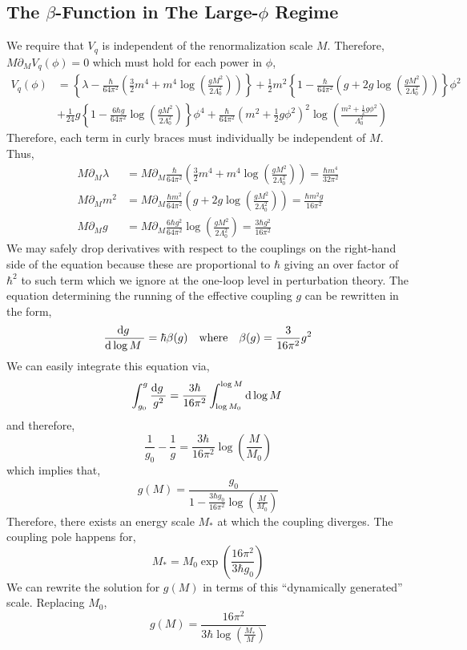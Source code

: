 \documentclass[12pt]{article}
\begin{document}
\subsection{The $\beta$-Function in The Large-$\phi$ Regime}


We require that $V_q$ is independent of the renormalization scale $M$. Therefore, $M \partial_M V_q(\phi) = 0$ which must hold for each power in $\phi$,
\begin{align*}
V_q(\phi) & = \left\{ \lambda - \frac{\hbar}{64 \pi^2} \left( \frac{3}{2} m^4 + m^4 \log{\left( \frac{g M^2}{2 \Lambda_0^2} \right)} \right) \right\} + \frac{1}{2} m^2 \left\{ 1 - \frac{\hbar}{64\pi^2} \left( g + 2 g \log{\left( \frac{g M^2}{2 \Lambda_0^2} \right)} \right) \right\} \phi^2 
\\
& + \frac{1}{24} g \left\{1 -  \frac{6 \hbar g}{64 \pi^2} \log{\left( \frac{g M^2}{2 \Lambda_0^2} \right)} \right\} \phi^4 
+ \frac{\hbar}{64 \pi^2} \left(m^2 + \tfrac{1}{2}  g \phi^2 \right)^2  \log{\left( \frac{m^2 + \tfrac{1}{2} g \phi^2 }{\Lambda_0^2}  \right)} 
\end{align*}
Therefore, each term in curly braces must individually be independent of $M$. Thus,
\begin{align*}
M \partial_M \lambda & = M \partial_M \frac{\hbar}{64 \pi^2} \left( \frac{3}{2} m^4 + m^4 \log{\left( \frac{g M^2}{2 \Lambda_0^2} \right)} \right) = \frac{\hbar m^4}{32 \pi^2} 
\\
M \partial_M m^2 & = M \partial_M \frac{\hbar m^2}{64\pi^2} \left( g + 2 g \log{\left( \frac{g M^2}{2 \Lambda_0^2} \right)} \right) =  \frac{\hbar m^2 g}{16 \pi^2}
\\
M \partial_M g & = M \partial_M \frac{6 \hbar g^2}{64 \pi^2} \log{\left( \frac{g M^2}{2 \Lambda_0^2} \right)} = \frac{3\hbar g^2}{16 \pi^2} 
\end{align*}
We may safely drop derivatives with respect to the couplings on the right-hand side of the equation because these are proportional to $\hbar$ giving an over factor of $\hbar^2$ to such term which we ignore at the one-loop level in perturbation theory. The equation determining the running of the effective coupling $g$ can be rewritten in the form,
\[ \frac{\mathrm{d}g \:}{\mathrm{d}\log{M} \:} = \hbar \beta(g) \quad \text{where} \quad \beta(g) = \frac{3}{16\pi^2} g^2 \]
We can easily integrate this equation via,
\[ \int_{g_0}^g \frac{\mathrm{d}g \:}{g^2} = \frac{3\hbar}{16 \pi^2} \int_{\log{M_0}}^{\log{M}} \mathrm{d}\log{M} \: \]
and therefore,
\[ \frac{1}{g_0} - \frac{1}{g} = \frac{3 \hbar}{16\pi^2} \log{\left( \frac{M}{M_0} \right)} \]
which implies that,
\[ g(M) = \frac{g_0}{1 - \frac{3 \hbar g_0}{16\pi^2} \log{\left( \frac{M}{M_0} \right)}} \]
Therefore, there exists an energy scale $M_*$ at which the coupling diverges. The coupling pole happens for,
\[ M_* = M_0 \exp{\left( \frac{16 \pi^2}{3 \hbar g_0} \right)} \]
We can rewrite the solution for $g(M)$ in terms of this ``dynamically generated'' scale. Replacing $M_0$,
\[ g(M) = \frac{16\pi^2}{3 \hbar \log{\left( \frac{M_*}{M} \right)}} \]
\end{document}
